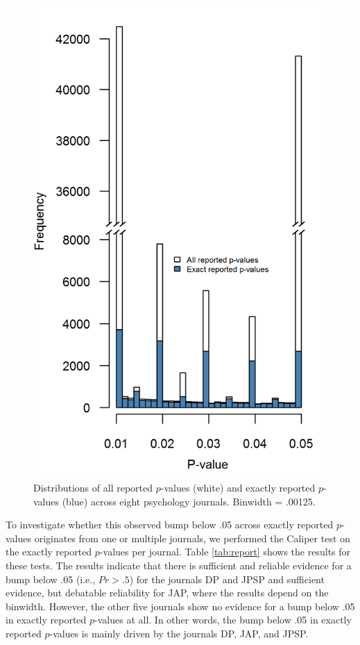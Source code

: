 \documentclass[a5paper]{book}
\begin{document}
\begin{figure}[h]

{\centering \includegraphics[width=13.1in]{assets/figures/bump-fig2} 

}

\caption{Distributions of all reported $p$-values (white) and exactly reported $p$-values (blue) across eight psychology journals. Binwidth = .00125.}\label{fig:bump-fig2}
\end{figure}

To investigate whether this observed bump below .05 across exactly
reported \(p\)-values originates from one or multiple journals, we
performed the Caliper test on the exactly reported \(p\)-values per
journal. Table \ref{tab:report} shows the results for these tests. The
results indicate that there is sufficient and reliable evidence for a
bump below .05 (i.e., \(Pr>.5\)) for the journals DP and JPSP and
sufficient evidence, but debatable reliability for JAP, where the
results depend on the binwidth. However, the other five journals show no
evidence for a bump below .05 in exactly reported \(p\)-values at all.
In other words, the bump below .05 in exactly reported \(p\)-values is
mainly driven by the journals DP, JAP, and JPSP.
\end{document}
